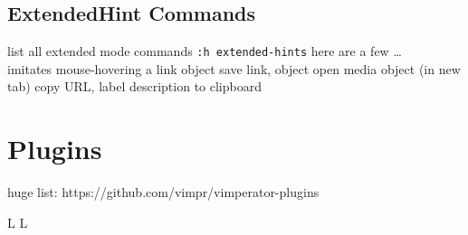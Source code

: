 \subsection{ExtendedHint Commands}{list all extended mode commands {\tt :h extended-hints}}
here are a few \ldots\\
\cmdS{;~}	{imitates mouse-hovering a link object}
	{save link, object}
	{open media object (in new tab)}
	{copy URL, label description to clipboard}

\section{Plugins}{huge list: https://github.com/vimpr/vimperator-plugins}
\copyrightnotice
%


\vfil
\supereject
\if L\lr \else\null\vfill\eject\fi
\if L\lr \else\null\vfill\eject\fi
\bye

